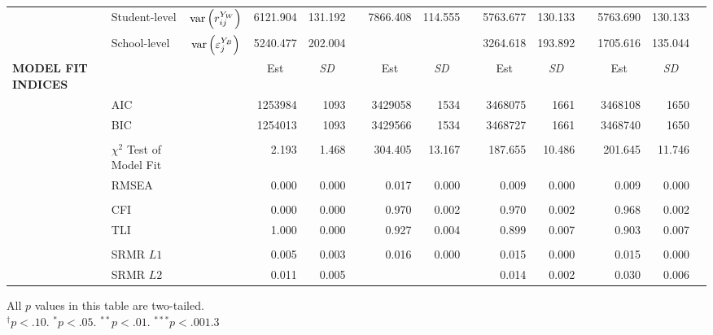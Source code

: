 {\begin{tabular}{l @{\hskip -7.9cm} l c rr @{\hskip -0.1mm}l rr @{\hskip -0.1mm}l rr @{\hskip -0.1mm}l rr @{\hskip -0.1mm}l}
    & Student-level & $\text{var}\left(r^{Y_W}_{ij}\right)$ & 6121.904 & 131.192 &       & 7866.408 & 114.555 &       & 5763.677 & 130.133 &       & 5763.690 & 130.133 &  \\
    & School-level & $\text{var}\left(\varepsilon^{Y_B}_j\right)$ & 5240.477 & 202.004 &       &       &       &       & 3264.618 & 193.892 &       & 1705.616 & 135.044 &  \\
\midrule
    \textbf{MODEL FIT INDICES} &       &       & \multicolumn{1}{c}{Est} & \multicolumn{1}{c}{\textit{SD}} &       & \multicolumn{1}{c}{Est} & \multicolumn{1}{c}{\textit{SD}} &       & \multicolumn{1}{c}{Est} & \multicolumn{1}{c}{\textit{SD}} &       & \multicolumn{1}{c}{Est} & \multicolumn{1}{c}{\textit{SD}} &  \\
    \cmidrule{4-5}\cmidrule{7-8}\cmidrule{10-11}\cmidrule{13-14}          & AIC   &       & 1253984 & 1093  &       & 3429058 & 1534  &       & 3468075 & 1661  &       & 3468108 & 1650  &  \\
    & BIC   &       & 1254013 & 1093  &       & 3429566 & 1534  &       & 3468727 & 1661  &       & 3468740 & 1650  &  \\
    &&&&&&&&&&&&&&\\
    & $\chi^2$ Test of Model Fit &       & 2.193 & 1.468 &       & 304.405 & 13.167 &       & 187.655 & 10.486 &       & 201.645 & 11.746 &  \\
    & RMSEA &       & 0.000 & 0.000 &       & 0.017 & 0.000 &       & 0.009 & 0.000 &       & 0.009 & 0.000 &  \\
    &&&&&&&&&&&&&&\\
    & CFI   &       & 0.000 & 0.000 &       & 0.970 & 0.002 &       & 0.970 & 0.002 &       & 0.968 & 0.002 &  \\
    & TLI   &       & 1.000 & 0.000 &       & 0.927 & 0.004 &       & 0.899 & 0.007 &       & 0.903 & 0.007 &  \\
    &&&&&&&&&&&&&&\\
    & SRMR $L1$ &       & 0.005 & 0.003 &       & 0.016 & 0.000 &       & 0.015 & 0.000 &       & 0.015 & 0.000 &  \\
    & SRMR $L2$ &       & 0.011 & 0.005 &       &       &       &       & 0.014 & 0.002 &       & 0.030 & 0.006 &  \\
\bottomrule
    \end{tabular}
}{All $p$ values in this table are two-tailed.\\
$^\dagger p < .10$. $^* p < .05$. $^{**} p < .01$. $^{***} p < .001$.}{3}

